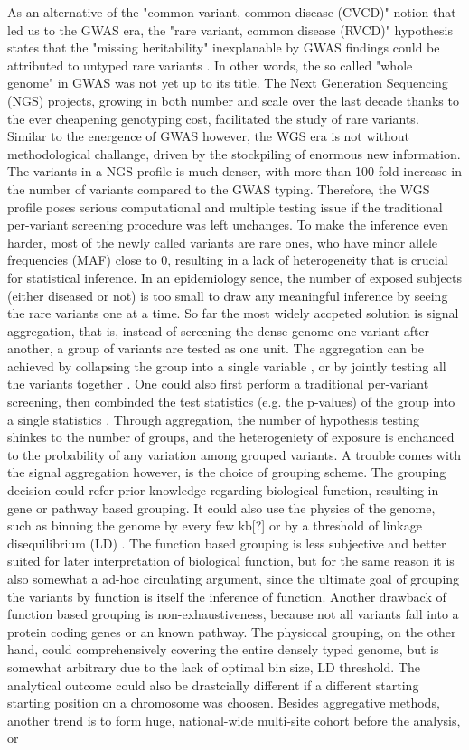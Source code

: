 \documentclass[twocolumn]{article}
\begin{document}
As an alternative of the "common variant, common disease (CVCD)" notion that led us to the GWAS era, the "rare variant, common disease (RVCD)" hypothesis states that the "missing heritability" inexplanable by GWAS findings could be attributed to untyped rare variants \cite{RVCD1}. In other words, the so called "whole genome" in GWAS was not yet up to its title. The Next Generation Sequencing (NGS) projects, growing in both number and scale over the last decade thanks to the ever cheapening genotyping cost, facilitated the study of rare variants. Similar to the energence of GWAS however, the WGS era is not without methodological challange, driven by the stockpiling of enormous new information. The variants in a NGS profile is much denser, with more than 100 fold increase in the number of variants compared to the GWAS typing. Therefore, the WGS profile poses serious computational and multiple testing issue if the traditional per-variant screening procedure was left unchanges. To make the inference even harder, most of the newly called variants are rare ones, who have minor allele frequencies (MAF) close to 0, resulting in a lack of heterogeneity that is crucial for statistical inference. In an epidemiology sence, the number of exposed subjects (either diseased or not) is too small to draw any meaningful inference by seeing the rare variants one at a time. So far the most widely accpeted solution is signal aggregation, that is, instead of screening the dense genome one variant after another, a group of variants are tested as one unit. The aggregation can be achieved by collapsing the group into a single variable \cite{Burden1}, or by jointly testing all the variants together \cite{Wei:HWU, Wu:SKAT}. One could also first perform a traditional per-variant screening, then combinded the test statistics (e.g. the p-values) of the group into a single statistics \cite{Dai:2015, plink1}. Through aggregation, the number of hypothesis testing shinkes to the number of groups, and the heterogeniety of exposure is enchanced to the probability of any variation among grouped variants. A trouble comes with the signal aggregation however, is the choice of grouping scheme. The grouping decision could refer prior knowledge regarding biological function, resulting in gene or pathway based grouping. It could also use the physics of the genome, such as binning the genome by every few kb[?] or by a threshold of linkage disequilibrium (LD) \cite{plink1}. The function based grouping is less subjective and better suited for later interpretation of biological function, but for the same reason it is also somewhat a ad-hoc circulating argument, since the ultimate goal of grouping the variants by function is itself the inference of function. Another drawback of function based grouping is non-exhaustiveness, because not all variants fall into a protein coding genes or an known pathway. The physiccal grouping, on the other hand, could comprehensively covering the entire densely typed genome, but is somewhat arbitrary due to the lack of optimal bin size, LD threshold. The analytical outcome could also be drastcially different if a different starting starting position on a chromosome was choosen. Besides aggregative methods, another trend is to form huge, national-wide multi-site cohort before the analysis, or 
\end{document}
